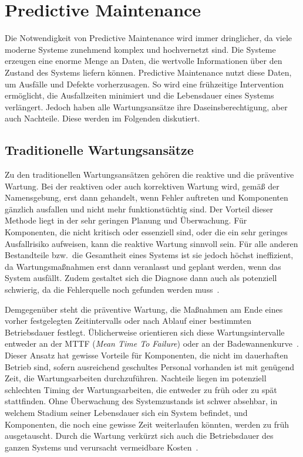 \chapter{Predictive Maintenance}\label{ch:pdm_theorie}
Die Notwendigkeit von Predictive Maintenance wird immer dringlicher, da viele moderne Systeme zunehmend komplex und hochvernetzt sind.
Die Systeme erzeugen eine enorme Menge an Daten, die wertvolle Informationen über den Zustand des
Systems liefern können. Predictive Maintenance nutzt diese Daten, um Ausfälle und Defekte vorherzusagen. So wird eine frühzeitige Intervention ermöglicht, die Ausfallzeiten minimiert und die Lebensdauer eines Systems verlängert.
Jedoch haben alle Wartungsansätze ihre Daseinsberechtigung, aber auch Nachteile. Diese werden im Folgenden diskutiert.

\section{Traditionelle Wartungsansätze}
Zu den traditionellen Wartungsansätzen gehören die reaktive und die präventive Wartung. Bei der reaktiven oder auch korrektiven
Wartung wird, gemäß der Namensgebung, erst dann gehandelt, wenn Fehler auftreten und Komponenten gänzlich ausfallen und nicht mehr
funktionstüchtig sind. Der Vorteil dieser Methode liegt in der sehr geringen Planung und Überwachung. Für Komponenten,
die nicht kritisch oder essenziell sind, oder die ein sehr geringes Ausfallrisiko aufweisen, kann die reaktive Wartung sinnvoll sein.
Für alle anderen Bestandteile bzw.~die Gesamtheit eines Systems ist sie jedoch höchst ineffizient, da Wartungsmaßnahmen erst dann
veranlasst und geplant werden, wenn das System ausfällt. Zudem gestaltet sich die Diagnose dann auch als potenziell schwierig, da die
Fehlerquelle noch gefunden werden muss~\cite{Abdelli2022}.

Demgegenüber steht die präventive Wartung, die Maßnahmen am Ende eines vorher festgelegten Zeitintervalls oder nach Ablauf einer
bestimmten Betriebsdauer festlegt. Üblicherweise orientieren sich diese
Wartungsintervalle entweder an der MTTF (\textit{Mean Time To Failure}) oder an der Badewannenkurve~\cite{Andrews2002}.
Dieser Ansatz hat gewisse Vorteile für Komponenten, die nicht im dauerhaften
Betrieb sind, sofern ausreichend geschultes Personal vorhanden ist mit genügend Zeit, die Wartungsarbeiten durchzuführen.
Nachteile liegen im potenziell schlechten Timing der Wartungsarbeiten, die entweder zu früh oder zu spät stattfinden. Ohne Überwachung
des Systemzustands ist schwer absehbar, in welchem Stadium seiner Lebensdauer sich ein System befindet, und Komponenten, die noch
eine gewisse Zeit weiterlaufen könnten, werden zu früh ausgetauscht. Durch die Wartung verkürzt sich auch die Betriebsdauer des ganzen
Systems und verursacht vermeidbare Kosten~\cite{Scheffer2004}.
